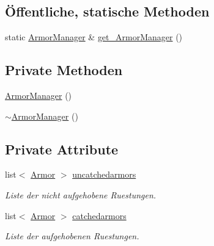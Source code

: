 \subsection*{Öffentliche, statische Methoden}
\begin{DoxyCompactItemize}
\item 
static \hyperlink{class_armor_manager}{Armor\-Manager} \& \hyperlink{class_armor_manager_ac2d0437101488564e279661ae9078d5a}{get\-\_\-\-Armor\-Manager} ()
\end{DoxyCompactItemize}
\subsection*{Private Methoden}
\begin{DoxyCompactItemize}
\item 
\hyperlink{class_armor_manager_af26ec77858038cb8c2b2b43627e7adb2}{Armor\-Manager} ()
\item 
\hyperlink{class_armor_manager_a7c3a729f1da566789a839a1b1c94cbb2}{$\sim$\-Armor\-Manager} ()
\end{DoxyCompactItemize}
\subsection*{Private Attribute}
\begin{DoxyCompactItemize}
\item 
list$<$ \hyperlink{class_armor}{Armor} $>$ \hyperlink{class_armor_manager_ae6bec783f6c8214faf838f831c130e99}{uncatchedarmors}
\begin{DoxyCompactList}\small\item\em Liste der nicht aufgehobene Ruestungen. \end{DoxyCompactList}\item 
list$<$ \hyperlink{class_armor}{Armor} $>$ \hyperlink{class_armor_manager_a9990b68ff8338a1cc83b74c2fdeb793a}{catchedarmors}
\begin{DoxyCompactList}\small\item\em Liste der aufgehobenen Ruestungen. \end{DoxyCompactList}\end{DoxyCompactItemize}


